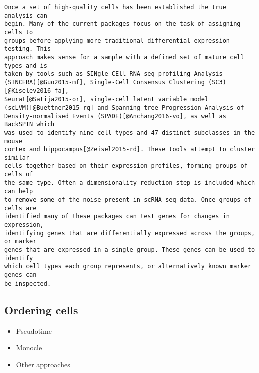 \documentclass[11pt,a4paper,titlepage,twoside,openright]{style/unimelbthesis}
\theoremstyle{definition}
\theoremstyle{definition}
\theoremstyle{definition}
\theoremstyle{remark}
\begin{document}
\begin{mainmatter}
\begin{verbatim}
Once a set of high-quality cells has been established the true analysis can
begin. Many of the current packages focus on the task of assigning cells to
groups before applying more traditional differential expression testing. This
approach makes sense for a sample with a defined set of mature cell types and is
taken by tools such as SINgle CEll RNA-seq profiling Analysis
(SINCERA)[@Guo2015-mf], Single-Cell Consensus Clustering (SC3)[@Kiselev2016-fa],
Seurat[@Satija2015-or], single-cell latent variable model
(scLVM)[@Buettner2015-rq] and Spanning-tree Progression Analysis of
Density-normalised Events (SPADE)[@Anchang2016-vo], as well as BackSPIN which
was used to identify nine cell types and 47 distinct subclasses in the mouse
cortex and hippocampus[@Zeisel2015-rd]. These tools attempt to cluster similar
cells together based on their expression profiles, forming groups of cells of
the same type. Often a dimensionality reduction step is included which can help
to remove some of the noise present in scRNA-seq data. Once groups of cells are
identified many of these packages can test genes for changes in expression,
identifying genes that are differentially expressed across the groups, or marker
genes that are expressed in a single group. These genes can be used to identify
which cell types each group represents, or alternatively known marker genes can
be inspected.
\end{verbatim}

\hypertarget{ordering-cells}{%
\subsection{Ordering cells}\label{ordering-cells}}

\begin{itemize}
\tightlist
\item
  Pseudotime
\item
  Monocle
\item
  Other approaches
\end{itemize}


\end{mainmatter}
\end{document}
